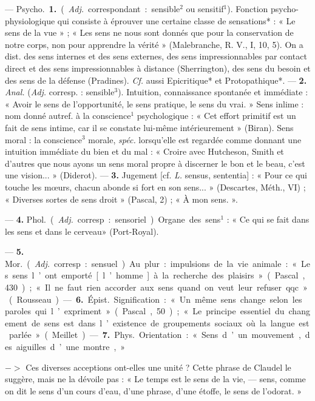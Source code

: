 \begin{itemize}[leftmargin=1cm, label=, itemsep=1pt]
 — \si{Psycho.} {\bf 1.} ({\it Adj.} correspondant : sensible$^2$ ou sensitif$^1$). Fonction psycho-physiologique qui consiste à éprouver une certaine classe
de sensations* : « Le sens de la vue » ;
« Les sens ne nous sont donnés que
pour la conservation de notre corps,
non pour apprendre la vérité » (Malebranche, R. V., I, 10, 5). On a dist.
des sens internes et des sens externes,
des sens impressionnables par contact direct et des sens impressionnables à distance (Sherrington), des
sens du besoin et des sens de la
défense (Pradines). {\it Cf.} aussi Epicritique* et Protopathique*. — {\bf 2.}
{\it Anal.} ({\it Adj.} corresp. : sensible$^3$).
Intuition, connaissance spontanée
et immédiate : « Avoir le sens de
l'opportunité, le sens pratique, le
sens du vrai. » Sens inlime : nom
donné autref. à la conscience$^1$ psychologique :
« Cet effort primitif est
un fait de sens intime, car il se
constate lui-même intérieurement »
(Biran). Sens moral : la conscience$^3$
morale, {\it spéc.} lorsqu'elle est regardée
comme donnant une intuition immédiate du bien et du mal : « Croire
avec Hutcheson, Smith et d'autres
que nous ayons un sens moral
propre à discerner le bon et le beau,
c'est une vision... » (Diderot). —
 {\bf 3.} Jugement [cf. {\it L.} sensus, sententia] : « Pour ce qui touche les
mœurs, chacun abonde si fort en
son sens... » (Descartes, Méth., VI) ;
« Diverses sortes de sens droit »
(Pascal, 2) ; « À mon sens. ».

— {\bf 4.} \si{Phol.} ({\it Adj.} corresp. : sensoriel). Organe des sens$^1$ : « Ce qui se
fait dans les sens et dans le cerveau»
(Port-Royal).

— {\bf 5.} \si{Mor.} ({\it Adj.} corresp. : sensuel). Au plur. : impulsions de la vie
animale : « Les sens l’ont emporté
[l’homme] à la recherche des plaisirs »
(Pascal, 430) ; «Il ne faut rien accorder aux sens quand on veut leur
refuser qqc. » (Rousseau).

— {\bf 6.} \si{Épist.} Signification : « Un
même sens change selon les paroles
qui l’expriment » (Pascal, 50) ; « Le
principe essentiel du changement de
sens est dans l’existence de groupements sociaux où la langue est
parlée » (Meillet).

— {\bf 7.} \si{Phys.} Orientation : « Sens
d’un mouvement, des aiguilles d’une
montre, »

$->$ Ces diverses acceptions ont-elles une unité ? Cette phrase de
Claudel le suggère, mais ne la dévoile
pas : « Le temps est le sens de la vie,
— sens, comme on dit le sens d’un
cours d’eau, d’une phrase, d’une
étoffe, le sens de l'odorat. »


\end{itemize}
